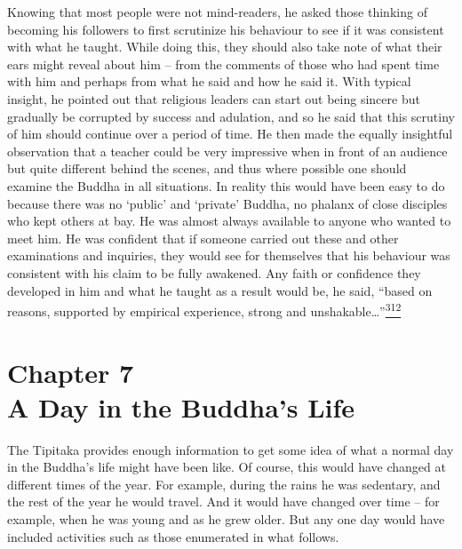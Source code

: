 Knowing that most people were not mind-readers, he asked those thinking
of becoming his followers to first scrutinize his behaviour to see if it
was consistent with what he taught. While doing this, they should also
take note of what their ears might reveal about him -- from the comments
of those who had spent time with him and perhaps from what he said and
how he said it. With typical insight, he pointed out that religious
leaders can start out being sincere but gradually be corrupted by
success and adulation, and so he said that this scrutiny of him should
continue over a period of time. He then made the equally insightful
observation that a teacher could be very impressive when in front of an
audience but quite different behind the scenes, and thus where possible
one should examine the Buddha in all situations. In reality this would
have been easy to do because there was no `public' and `private' Buddha,
no phalanx of close disciples who kept others at bay. He was almost
always available to anyone who wanted to meet him. He was confident that
if someone carried out these and other examinations and inquiries, they
would see for themselves that his behaviour was consistent with his
claim to be fully awakened. Any faith or confidence they developed in
him and what he taught as a result would be, he said, ``based on
reasons, supported by empirical experience, strong and
unshakable\ldots''\label{footprints_split_010.html_fnref312}\hyperref[footprints_split_024.htmlux5cux23fn312]{\textsuperscript{312}}

\label{footprints_split_010.html_calibre_pb_21}

\label{footprints_split_011.html}{}

\section{\texorpdfstring{{Chapter 7}\\
A Day in the Buddha's
Life}{Chapter 7 A Day in the Buddha's Life}}\label{footprints_split_011.html_TOCTarget7}

The Tipitaka provides enough information to get some idea of what a
normal day in the Buddha's life might have been like. Of course, this
would have changed at different times of the year. For example, during
the rains he was sedentary, and the rest of the year he would travel.
And it would have changed over time -- for example, when he was young
and as he grew older. But any one day would have included activities
such as those enumerated in what follows.

